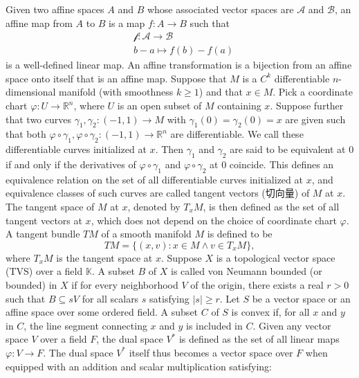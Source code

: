 \documentclass[a4paper,12pt]{report}
\begin{document}
Given two affine spaces $A$ and $B$ whose associated vector spaces are $\mathscr{A}$ and $\mathscr{B}$, an affine map from $A$ to $B$ is a map $f\colon A\to B$ such that
\[\begin{aligned}
&\mathscr{f}\colon\mathscr{A}\to\mathscr{B}\\
&b-a\mapsto f(b)-f(a)
\end{aligned}\]
is a well-defined linear map.
An affine transformation is a bijection from an affine space onto itself that is an affine map.
Suppose that $M$ is a $C^k$ differentiable $n$-dimensional manifold (with smoothness $k\geq 1$) and that $x\in M$. Pick a coordinate chart $\varphi\colon U\to\mathbb{R}^n$, where $U$ is an open subset of $M$ containing $x$. Suppose further that two curves $\gamma_1,\gamma_2\colon (-1,1)\to M$ with $\gamma_1(0)=\gamma_2(0)=x$ are given such that both $\varphi\circ\gamma_1,\varphi\circ\gamma_2\colon (-1,1)\to\mathbb{R}^n$ are differentiable. We call these differentiable curves initialized at $x$. Then $\gamma_1$ and $\gamma_2$ are said to be equivalent at $0$ if and only if the derivatives of $\varphi\circ\gamma_1$ and $\varphi\circ\gamma_2$ at $0$ coincide. This defines an equivalence relation on the set of all differentiable curves initialized at $x$, and equivalence classes of such curves are called tangent vectors (切向量) of $M$ at $x$. The tangent space of $M$ at $x$, denoted by $T_xM$, is then defined as the set of all tangent vectors at $x$, which does not depend on the choice of coordinate chart $\varphi$.
A tangent bundle $TM$ of a smooth manifold $M$ is defined to be
\[TM=\{(x,v)\colon x\in M\land v\in T_xM\},\]
where $T_xM$ is the tangent space at $x$.
Suppose $X$ is a topological vector space (TVS) over a field $\mathbb{K}$. A subset $B$ of $X$ is called von Neumann bounded (or bounded) in $X$ if for every neighborhood $V$ of the origin, there exists a real $r>0$ such that $B\subseteq sV$ for all scalars $s$ satisfying $|s|\geq r$.
Let $S$ be a vector space or an affine space over some ordered field. A subset $C$ of $S$ is convex if, for all $x$ and $y$ in $C$, the line segment connecting $x$ and $y$ is included in $C$.
Given any vector space $V$ over a field $F$, the dual space $V^*$ is defined as the set of all linear maps $\varphi\colon V\to F$. The dual space $V^*$ itself thus becomes a vector space over $F$ when equipped with an addition and scalar multiplication satisfying:
\end{document}
